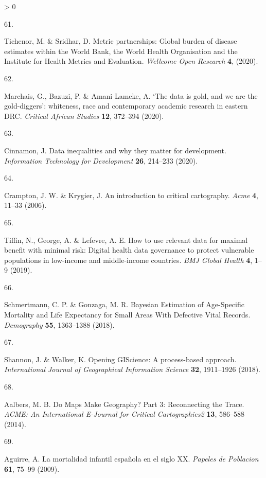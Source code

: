 \documentclass[
]{article}
\newlength{\cslhangindent}
\newlength{\csllabelwidth}
\newenvironment{CSLReferences}[2] %
 {%
  \setlength{\parindent}{0pt}
  \ifodd #1 \everypar{\setlength{\hangindent}{\cslhangindent}}\ignorespaces\fi
  \ifnum #2 > 0
  \setlength{\parskip}{#2\baselineskip}
  \fi
 }%
 {}
\newcommand{\CSLLeftMargin}[1]{\parbox[t]{\csllabelwidth}{#1}}
\newcommand{\CSLRightInline}[1]{\parbox[t]{\linewidth - \csllabelwidth}{#1}\break}
\begin{document}
\begin{CSLReferences}{0}{0}
\leavevmode\hypertarget{ref-Tichenor2020}{}%
\CSLLeftMargin{61. }
\CSLRightInline{Tichenor, M. \& Sridhar, D. {Metric partnerships: Global burden of disease estimates within the World Bank, the World Health Organisation and the Institute for Health Metrics and Evaluation}. \emph{Wellcome Open Research} \textbf{4}, (2020).}

\leavevmode\hypertarget{ref-Marchais2020}{}%
\CSLLeftMargin{62. }
\CSLRightInline{Marchais, G., Bazuzi, P. \& Amani Lameke, A. {`The data is gold, and we are the gold-diggers': whiteness, race and contemporary academic research in eastern DRC}. \emph{Critical African Studies} \textbf{12}, 372--394 (2020).}

\leavevmode\hypertarget{ref-Cinnamon2020a}{}%
\CSLLeftMargin{63. }
\CSLRightInline{Cinnamon, J. {Data inequalities and why they matter for development}. \emph{Information Technology for Development} \textbf{26}, 214--233 (2020).}

\leavevmode\hypertarget{ref-Crampton2006}{}%
\CSLLeftMargin{64. }
\CSLRightInline{Crampton, J. W. \& Krygier, J. {An introduction to critical cartography}. \emph{Acme} \textbf{4}, 11--33 (2006).}

\leavevmode\hypertarget{ref-Tiffin2019}{}%
\CSLLeftMargin{65. }
\CSLRightInline{Tiffin, N., George, A. \& Lefevre, A. E. {How to use relevant data for maximal benefit with minimal risk: Digital health data governance to protect vulnerable populations in low-income and middle-income countries}. \emph{BMJ Global Health} \textbf{4}, 1--9 (2019).}

\leavevmode\hypertarget{ref-Schmertmann2018}{}%
\CSLLeftMargin{66. }
\CSLRightInline{Schmertmann, C. P. \& Gonzaga, M. R. {Bayesian Estimation of Age-Specific Mortality and Life Expectancy for Small Areas With Defective Vital Records}. \emph{Demography} \textbf{55}, 1363--1388 (2018).}

\leavevmode\hypertarget{ref-Shannon2018}{}%
\CSLLeftMargin{67. }
\CSLRightInline{Shannon, J. \& Walker, K. {Opening GIScience: A process-based approach}. \emph{International Journal of Geographical Information Science} \textbf{32}, 1911--1926 (2018).}

\leavevmode\hypertarget{ref-Aalbers}{}%
\CSLLeftMargin{68. }
\CSLRightInline{Aalbers, M. B. {Do Maps Make Geography? Part 3: Reconnecting the Trace}. \emph{ACME: An International E-Journal for Critical Cartographies2} \textbf{13}, 586--588 (2014).}

\leavevmode\hypertarget{ref-Aguirre2009}{}%
\CSLLeftMargin{69. }
\CSLRightInline{Aguirre, A. {La mortalidad infantil espa{ñ}ola en el siglo XX}. \emph{Papeles de Poblacion} \textbf{61}, 75--99 (2009).}

\end{CSLReferences}
\end{document}
